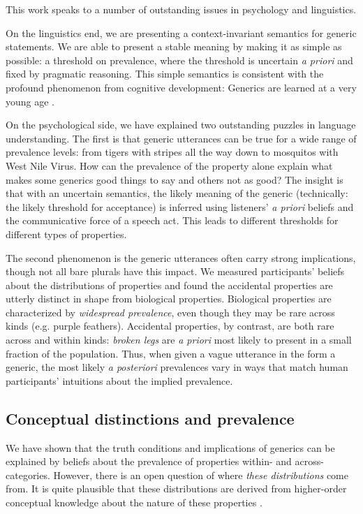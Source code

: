\documentclass[10pt,letterpaper]{article}
\begin{document}
This work speaks to a number of outstanding issues in psychology and linguistics. 

On the linguistics end, we are presenting a context-invariant semantics for generic statements. 
We are able to present a stable meaning by making it as simple as possible: a threshold on prevalence, where the threshold is uncertain \emph{a priori} and fixed by pragmatic reasoning.
This simple semantics is consistent with the profound phenomenon from cognitive development: Generics are learned at a very young age \cite{Gelman1998, Gelman2004, Gelman2008, Cimpian2008}.

On the psychological side, we have explained two outstanding puzzles in language understanding. 
The first is that generic utterances can be true for a wide range of prevalence levels: from tigers with stripes all the way down to mosquitos with West Nile Virus. 
How can the prevalence of the property alone explain what makes some generics good things to say and others not as good? 
The insight is that with an uncertain semantics, the likely meaning of the generic (technically: the likely threshold for acceptance) is inferred using listeners' \emph{a priori} beliefs and the communicative force of a speech act. 
This leads to different thresholds for different types of properties. 

The second phenomenon is the generic utterances often carry strong implications, though not all bare plurals have this impact. 
We measured participants' beliefs about the distributions of properties and found the accidental properties are utterly distinct in shape from biological properties.
Biological properties are characterized by \emph{widespread prevalence}, even though they may be rare across kinds (e.g. purple feathers).
Accidental properties, by contrast, are both rare across and within kinds: \emph{broken legs} are \emph{a priori} most likely to present in a small fraction of the population.
Thus, when given a vague utterance in the form a generic, the most likely \emph{a posteriori} prevalences vary in ways that match human participants' intuitions about the implied prevalence.


\subsection{Conceptual distinctions and prevalence}

We have shown that the truth conditions and implications of generics can be explained by beliefs about the prevalence of properties within- and across- categories. 
However, there is an open question of where \emph{these distributions} come from. 
It is quite plausible that these distributions are derived from higher-order conceptual knowledge about the nature of these properties \cite{Gelman2005, Keil1992}.
\end{document}
